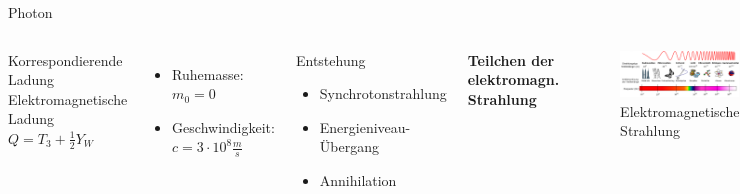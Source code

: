 \documentclass[aspectratio=169,xcolor=dvipsnames]{beamer}
\begin{document}
\begin{frame}{Photon}
    \begin{columns}[c]
        \begin{block}{Korrespondierende Ladung}
            Elektromagnetische Ladung $Q = T_3 + \frac{1}{2}Y_W$ %
        \end{block}
        \vspace{10pt}
        \begin{itemize}
            \item Ruhemasse: $m_0 = 0$ %
            \item Geschwindigkeit: $c = 3 \cdot 10^8 \frac{m}{s}$
        \end{itemize}
        \vspace{10pt}
        \begin{exampleblock}{Entstehung}
            \begin{itemize}
                \item Synchrotonstrahlung
                \item Energieniveau-Übergang
                \item Annihilation
            \end{itemize}
        \end{exampleblock}
        \pause
        \textbf{Teilchen der elektromagn. Strahlung}
        \vspace{10pt}
        \begin{figure}
            \centering
            \includegraphics[width=1\linewidth]{figures/elekmagnstrahlung.png}
            \caption{Elektromagnetische Strahlung}
            \label{fig:elekmagnstrahlung}
        \end{figure}
    \end{columns}
\end{frame}
\end{document}
